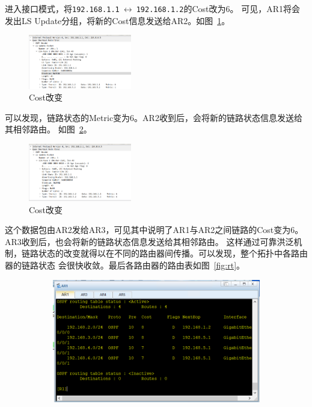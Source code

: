 \documentclass[a4paper,twoside]{article}
\begin{document}
\begin{spacing}{1.2}
进入接口模式，将\texttt{192.168.1.1}$\ \longleftrightarrow \ $\texttt{192.168.1.2}的Cost改为6。
可见，AR1将会发出LS Update分组，将新的Cost信息发送给AR2。如图~\ref{fig:costchange}。
\begin{figure}[htb]
	\centering
	\caption{Cost改变}
	\label{fig:costchange}
	\includegraphics[width=0.4\textwidth]{inccost.png}
\end{figure}
可以发现，链路状态的Metric变为6。AR2收到后，会将新的链路状态信息发送给其相邻路由。
如图~\ref{fig:costchange2}。
\begin{figure}[htb]
	\centering
	\caption{Cost改变}
	\label{fig:costchange2}
	\includegraphics[width=0.4\textwidth]{22lup.png}
\end{figure}
这个数据包由AR2发给AR3，可见其中说明了AR1与AR2之间链路的Cost变为6。AR3收到后，也会将新的链路状态信息发送给其相邻路由。
这样通过可靠洪泛机制，链路状态的改变就得以在不同的路由器间传播。可以发现，整个拓扑中各路由器的链路状态
会很快收敛。最后各路由器的路由表如图~\ref{fig:rt}。
\begin{figure}[bp]
	\centering
	\caption{各路由器的路由表}
	\label{fig:rt}
	\begin{subfigure}{0.4\textwidth}
		\centering
		\includegraphics[width=\textwidth]{ar1.png}

\end{subfigure}
\end{figure}
\end{spacing}
\end{document}
